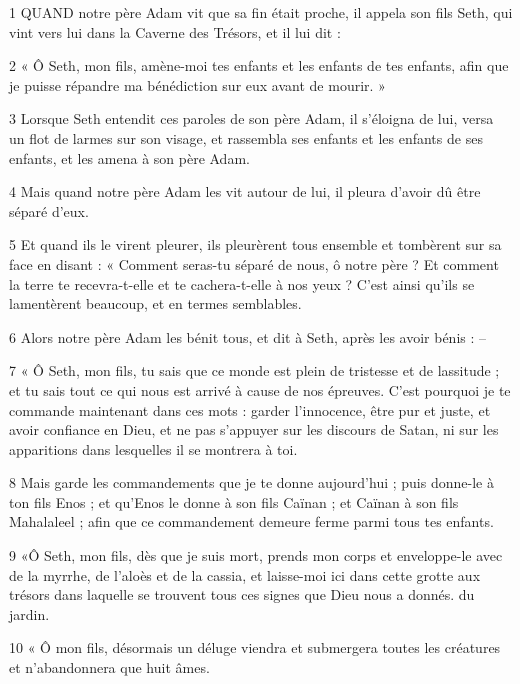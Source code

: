 \par 1 QUAND notre père Adam vit que sa fin était proche, il appela son fils Seth, qui vint vers lui dans la Caverne des Trésors, et il lui dit :

\par 2 « Ô Seth, mon fils, amène-moi tes enfants et les enfants de tes enfants, afin que je puisse répandre ma bénédiction sur eux avant de mourir. »

\par 3 Lorsque Seth entendit ces paroles de son père Adam, il s'éloigna de lui, versa un flot de larmes sur son visage, et rassembla ses enfants et les enfants de ses enfants, et les amena à son père Adam.

\par 4 Mais quand notre père Adam les vit autour de lui, il pleura d'avoir dû être séparé d'eux.

\par 5 Et quand ils le virent pleurer, ils pleurèrent tous ensemble et tombèrent sur sa face en disant : « Comment seras-tu séparé de nous, ô notre père ? Et comment la terre te recevra-t-elle et te cachera-t-elle à nos yeux ? C'est ainsi qu'ils se lamentèrent beaucoup, et en termes semblables.

\par 6 Alors notre père Adam les bénit tous, et dit à Seth, après les avoir bénis : --

\par 7 « Ô Seth, mon fils, tu sais que ce monde est plein de tristesse et de lassitude ; et tu sais tout ce qui nous est arrivé à cause de nos épreuves. C'est pourquoi je te commande maintenant dans ces mots : garder l'innocence, être pur et juste, et avoir confiance en Dieu, et ne pas s'appuyer sur les discours de Satan, ni sur les apparitions dans lesquelles il se montrera à toi.

\par 8 Mais garde les commandements que je te donne aujourd'hui ; puis donne-le à ton fils Enos ; et qu'Enos le donne à son fils Caïnan ; et Caïnan à son fils Mahalaleel ; afin que ce commandement demeure ferme parmi tous tes enfants.

\par 9 «Ô Seth, mon fils, dès que je suis mort, prends mon corps et enveloppe-le avec de la myrrhe, de l'aloès et de la cassia, et laisse-moi ici dans cette grotte aux trésors dans laquelle se trouvent tous ces signes que Dieu nous a donnés. du jardin.

\par 10 « Ô mon fils, désormais un déluge viendra et submergera toutes les créatures et n'abandonnera que huit âmes.


